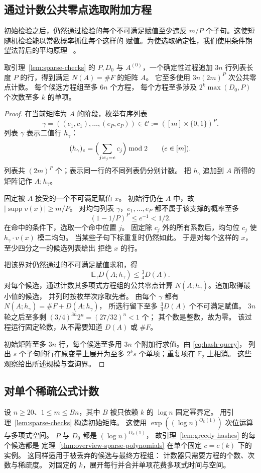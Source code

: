 \subsection{通过计数公共零点选取附加方程}
初始检验之后，仍然通过检验的每个不可满足赋值至少违反
$m/P$ 个子句。这使短随机检验能以常数概率抓住每个这样的
赋值。为使选取确定性，我们使用条件期望法背后的平均原理
~\cite{Raghavan88}。

\begin{lemma}\label{lem:greedy-hashes}
取引理~\ref{lem:sparse-checks} 的 $P,D_0$ 与
$A^{(0)}$，一个确定性过程追加 $3n$ 行列表长度 $P$
的行，得到满足 $N(A)=\#F$ 的矩阵 $A$。
它至多使用 $3n(2m)^P$ 次公共零点计数。
每个候选方程组至多 $6n$ 个方程，
每个方程至多涉及 $2^k\max(D_0,P)$ 个次数至多 $k$
的单项。
\end{lemma}
\begin{proof}
在当前矩阵为 $A$ 的阶段，枚举有序列表
\[
 \gamma=((e_1,c_1),\ldots,(e_P,c_P))
 \in\mathcal C:=([m]\times\{0,1\})^P.
\]
列表 $\gamma$ 表示二值行 $h_\gamma$：
\[
 (h_\gamma)_e=
 \Bigl(\sum_{j:e_j=e}c_j\Bigr)\bmod2
 \qquad(e\in[m]).
\]
列表共 $(2m)^P$ 个；表示同一行的不同列表仍分别计数。
把 $h_\gamma$ 追加到 $A$ 所得的矩阵记作
$A;h_\gamma$。

固定被 $A$ 接受的一个不可满足赋值 $x$。
初始行仍在 $A$ 中，故
$|\operatorname{supp}v(x)|\ge m/P$。
对均匀列表 $\gamma$，$e_1,\ldots,e_P$
都不属于该支撑的概率至多
\[
 (1-1/P)^P\le e^{-1}<1/2.
\]
在命中的条件下，选取一个命中位置 $j$。
固定除 $c_j$ 外的所有系数后，均匀位 $c_j$
使 $h_\gamma\cdot v(x)$ 模二均匀。
当某些子句下标重复时仍然如此。
于是对每个这样的 $x$，至少四分之一的候选列表给出
拒绝 $x$ 的行。

把该界对仍然通过的不可满足赋值求和，得
\[
 \mathbb E_\gamma D(A;h_\gamma)\le\tfrac34 D(A).
\]
对每个候选，通过计数其多项式方程组的公共零点计算
$N(A;h_\gamma)$。追加取得最小值的候选，
并列时按枚举次序取先者。
由每个 $\gamma$ 都有
$N(A;h_\gamma)=\#F+D(A;h_\gamma)$，
所选行留下至多 $\tfrac34 D(A)$ 个不可满足赋值。
$3n$ 轮之后至多剩
$(3/4)^{3n}2^n=(27/32)^n<1$ 个；
其个数是整数，故为零。
该过程运行固定轮数，从不需要知道 $D(A)$ 或 $\#F$。

初始矩阵至多 $3n$ 行，每个候选至多用 $3n$
个附加行求值。由 \eqref{eq:hash-query}，
列出 $s$ 个子句的行在原变量上展开为至多 $2^k s$
个单项；重复项在 $\mathbb F_2$ 上相消。
这些观察给出所述规模与查询界。
\end{proof}

\subsection{对单个稀疏公式计数}\label{subsec:count-sparse}
设 $n\ge20$、$1\le m\le Bn$，其中 $B$
被只依赖 $k$ 的 $\log n$ 固定幂界定。
用引理~\ref{lem:sparse-checks} 构造初始矩阵。
这使用 $\exp((\log n)^{O_k(1)})$ 次位运算与多项式空间。
$P$ 与 $D_0$ 都是 $(\log n)^{O_k(1)}$，
故引理~\ref{lem:greedy-hashes} 的每个候选都是
定理~\ref{thm:overview-sparse-polynomials}
在单个固定 $c=c(k)$ 下的实例。
这同样适用于被丢弃的候选与最终方程组：
计数器只需要方程的个数、次数与稀疏度。
对固定的 $k$，展开每行并合并单项花费多项式时间与空间。

